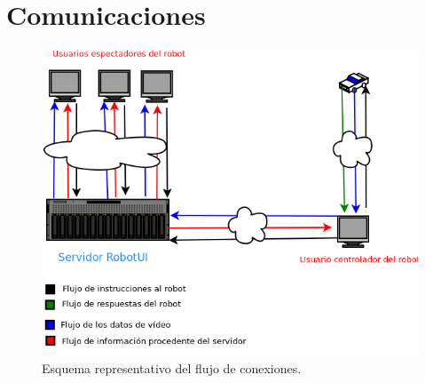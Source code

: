 \chapter{Comunicaciones}
\label{chap:robot}

\begin{figure}
  \begin{center}
    \includegraphics[scale=0.5]{diagramas/flujo-comunicaciones.png}
  \end{center}
  \caption{Esquema representativo del flujo de conexiones.}
  \label{gantt:tareas01}
\end{figure}
 
